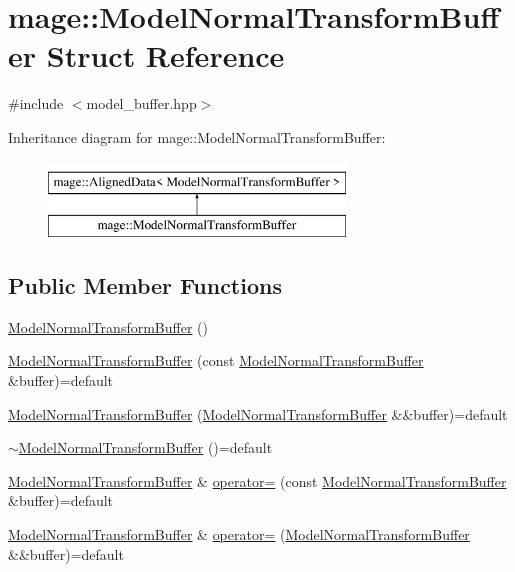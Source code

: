 \hypertarget{structmage_1_1_model_normal_transform_buffer}{}\section{mage\+:\+:Model\+Normal\+Transform\+Buffer Struct Reference}
\label{structmage_1_1_model_normal_transform_buffer}


{\ttfamily \#include $<$model\+\_\+buffer.\+hpp$>$}

Inheritance diagram for mage\+:\+:Model\+Normal\+Transform\+Buffer\+:\begin{figure}[H]
\begin{center}
\leavevmode
\includegraphics[height=2.000000cm]{structmage_1_1_model_normal_transform_buffer}
\end{center}
\end{figure}
\subsection*{Public Member Functions}
\begin{DoxyCompactItemize}
\item 
\hyperlink{structmage_1_1_model_normal_transform_buffer_a0ab367c167f3056d32ad06299d9953d0}{Model\+Normal\+Transform\+Buffer} ()
\item 
\hyperlink{structmage_1_1_model_normal_transform_buffer_a2718abe76ffc0d6cd278aad9d4020429}{Model\+Normal\+Transform\+Buffer} (const \hyperlink{structmage_1_1_model_normal_transform_buffer}{Model\+Normal\+Transform\+Buffer} \&buffer)=default
\item 
\hyperlink{structmage_1_1_model_normal_transform_buffer_a415530ed6d4a2bd31424b11af6b1ebee}{Model\+Normal\+Transform\+Buffer} (\hyperlink{structmage_1_1_model_normal_transform_buffer}{Model\+Normal\+Transform\+Buffer} \&\&buffer)=default
\item 
\hyperlink{structmage_1_1_model_normal_transform_buffer_a157d1f7cc47463f6b589d25c039ec418}{$\sim$\+Model\+Normal\+Transform\+Buffer} ()=default
\item 
\hyperlink{structmage_1_1_model_normal_transform_buffer}{Model\+Normal\+Transform\+Buffer} \& \hyperlink{structmage_1_1_model_normal_transform_buffer_ae0b033dc93145a55e5e00024f8f95330}{operator=} (const \hyperlink{structmage_1_1_model_normal_transform_buffer}{Model\+Normal\+Transform\+Buffer} \&buffer)=default
\item 
\hyperlink{structmage_1_1_model_normal_transform_buffer}{Model\+Normal\+Transform\+Buffer} \& \hyperlink{structmage_1_1_model_normal_transform_buffer_acc27af2e1e65994a43e1d804aa25bb5a}{operator=} (\hyperlink{structmage_1_1_model_normal_transform_buffer}{Model\+Normal\+Transform\+Buffer} \&\&buffer)=default
\end{DoxyCompactItemize}
